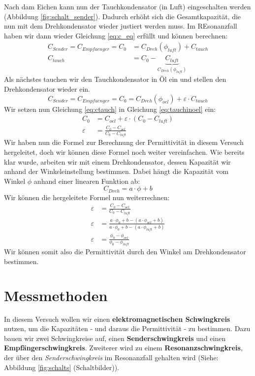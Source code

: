\documentclass[10pt,a4paper]{article}
\begin{document}
\begin{flushleft}
Nach dam Eichen kann nun der Tauchkondensator (in Luft) eingeschalten werden (Abbildung \ref{fig:schalt_sender}). Dadurch erhöht sich die Gesamtkapazität, die nun mit dem Drehkondensator wieder justiert werden muss. Im REsonanzfall haben wir dann wieder Gleichung \ref{eq:c_eq} erfüllt und können berechnen:
\begin{align}
C_{Sender} = C_{Empfaenger} = C_0 &= C_{Dreh}(\phi_{luft}) + C_{tauch} \label{eq:cs=cd+ct} \\
C_{tauch} &= C_0 - \underbrace{C_{luft}}_{C_{Dreh}(\phi_{luft})} \label{eq:ctauch}
\end{align}
Als nächstes tauchen wir den Tauchkondensator in Öl ein und stellen den Drehkondensator wieder ein.
\begin{equation}\label{eq:tauchinoel}
C_{Sender} = C_{Empfaenger} = C_0 = C_{Dreh}(\phi_{oel}) + \varepsilon \cdot C_{tauch}
\end{equation}
Wir setzen nun Gleichung \ref{eq:ctauch} in Gleichung \ref{eq:tauchinoel} ein:
\begin{align}
C_0 &= C_{oel} + \varepsilon \cdot (C_0 - C_{luft}) \\
\varepsilon &= \frac{C_0 - C_{oel}}{C_0 - C_{luft}} \label{eq:epsi_wc}
\end{align}
Wir haben nun die Formel zur Berechnung der Permittivität in diesem Versuch hergeleitet, doch wir können diese Formel noch weiter vereinfachen. Wie bereits klar wurde, arbeiten wir mit einem Drehkondensator, dessen Kapazität wir anhand der Winkeleinstellung bestimmen. Dabei hängt die Kapazität vom Winkel $\phi$ anhand einer linearen Funktion ab:
\begin{equation}
C_{Dreh} = a \cdot \phi + b
\end{equation}
Wir können die hergeleitete Formel nun weiterrechnen:
\begin{align}
\varepsilon &= \frac{C_0 - C_{oel}}{C_0 - C_{luft}} \nonumber \\
\varepsilon &= \frac{a \cdot \phi_0 + b - (a \cdot \phi_{oel} + b)}{a \cdot \phi_0 + b - (a \cdot \phi_{luft} + b)} \nonumber \\
\varepsilon &= \frac{\phi_0 - \phi_{oel}}{\phi_0 - \phi_{luft}}
\end{align}
Wir können somit also die Permittivität durch den Winkel am Drehkondensator bestimmen.
\end{flushleft}

\section{Messmethoden}
\begin{flushleft}
In diesem Versuch wollen wir einen \textbf{elektromagnetischen Schwingkreis} nutzen, um die Kapazitäten - und daraus die Permittivität - zu bestimmen. Dazu bauen wir zwei Schwingkreise auf, einen \textbf{Senderschwingkreis} und einen \textbf{Empfängerschwingkreis}. Zweiterer wird zu einem \textbf{Resonanzschwingkreis}, der über den \textit{Senderschwingkreis} im Resonanzfall gehalten wird (Siehe: Abbildung \ref{fig:schalts} (Schaltbilder)).
\end{flushleft}
\end{document}
